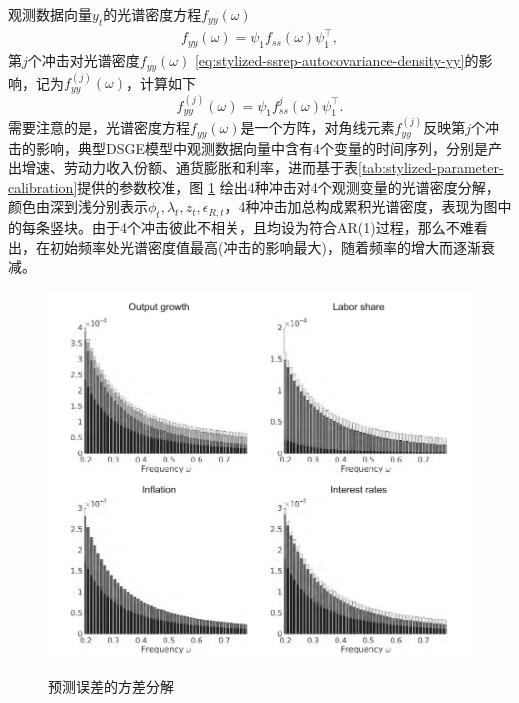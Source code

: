 观测数据向量$y_{t}$的光谱密度方程$f_{yy} \left( \omega \right)$
\begin{equation}
  \label{eq:stylized-ssrep-autocovariance-density-yy}
  \begin{split}
    f_{yy} \left( \omega \right)
    = \psi_{1} f_{ss} \left( \omega \right) \psi_{1}^{\top},
  \end{split}
\end{equation}
第$j$个冲击对光谱密度$f_{yy} \left( \omega \right)$ \eqref{eq:stylized-ssrep-autocovariance-density-yy}的影响，记为$f_{yy}^{(j)} \left( \omega \right)$，计算如下
\begin{equation}
  \label{eq:stylized-ssrep-autocovariance-density-yy-j}
  f_{yy}^{(j)} \left( \omega \right)
  = \psi_{1} f_{ss}^{j} \left( \omega \right) \psi_{1}^{\top}.
\end{equation}
需要注意的是，光谱密度方程$f_{yy} \left( \omega \right)$是一个方阵，对角线元素$f_{yy}^{(j)}$反映第$j$个冲击的影响，典型DSGE模型中观测数据向量中含有4个变量的时间序列，分别是产出增速、劳动力收入份额、通货膨胀和利率，进而基于表\ref{tab:stylized-parameter-calibration}提供的参数校准，图  \ref{fig:stylized-ssrep-spectral-decomposition}
绘出4种冲击对4个观测变量的光谱密度分解，颜色由深到浅分别表示$\phi_{t}, \lambda_{t}, z_{t}, \epsilon_{R,t}$，4种冲击加总构成累积光谱密度，表现为图中的每条竖块。由于4个冲击彼此不相关，且均设为符合AR(1)过程，那么不难看出，在初始频率处光谱密度值最高(冲击的影响最大)，随着频率的增大而逐渐衰减。

\begin{figure}[htbp]
  \caption{预测误差的方差分解}
  \centering
  \includegraphics[width=12cm]{./Figures/20180403-spectral-decomposition}
  \label{fig:stylized-ssrep-spectral-decomposition}
%
\end{figure}

